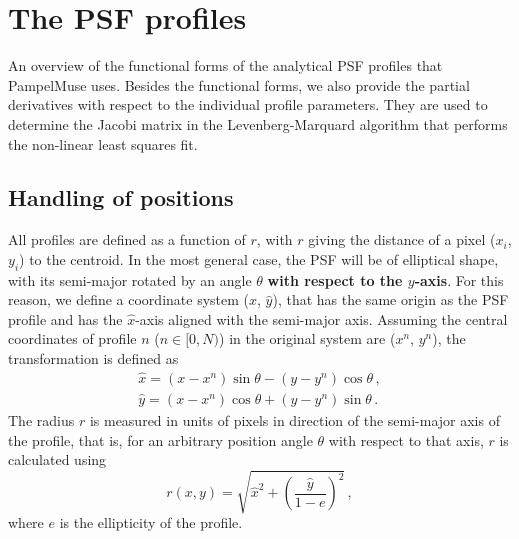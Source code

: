 % 
% 
% 
% 
% 

\graphicspath{{./../images/}}

\section{The PSF profiles}
\label{app:profiles}

An overview of the functional forms of the analytical PSF profiles that PampelMuse uses. Besides the functional forms, we also provide the partial derivatives with respect to the individual profile parameters. They are used to determine the Jacobi matrix in the Levenberg-Marquard algorithm that performs the non-linear least squares fit.

\subsection{Handling of positions}
\label{sec:positions}

All profiles are defined as a function of $r$, with $r$ giving the distance of a pixel ($x_i$, $y_i$) to the centroid. In the most general case, the PSF will be of elliptical shape, with its semi-major rotated by an angle $\theta$ \textbf{with respect to the $y$-axis}. For this reason, we define a coordinate system (${\hat x}$, ${\hat y}$), that has the same origin as the PSF profile and has the ${\hat x}$-axis aligned with the semi-major axis. Assuming the central coordinates of profile $n$ ($n\in[0,N)$) in the original system are ($x^n$, $y^n$), the transformation is defined as
%
\begin{align} 
 {\hat x} = (x-x^n)\sin\theta - (y-y^n)\cos\theta\,,
\label{eq:psf_x} \\
%
 {\hat y} = (x-x^n)\cos\theta + (y-y^n)\sin\theta\,.
\label{eq:psf_y}
\end{align}
%
The radius $r$ is measured in units of pixels in direction of the semi-major axis of the profile, that is, for an arbitrary position angle $\theta$ with respect to that axis, $r$ is calculated using
%
\begin{equation} \label{eq:psf_radius}
 r(x, y) = \sqrt{{\hat x}^2 + \left( \frac{\hat y}{1-e} \right)^2} \,,
\end{equation}
%
where $e$ is the ellipticity of the profile.


